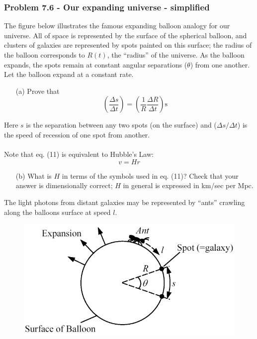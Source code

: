 \documentclass[12pt,a4paper]{article}
\begin{document}
\subsubsection*{Problem 7.6 - Our expanding universe - simplified}
The figure below illustrates the famous expanding balloon analogy for our universe. All of space is represented by the surface of the spherical balloon, and clusters of galaxies are represented by spots
painted on this surface; the radius of the balloon corresponds to $R(t)$, the “radius” of the universe. As the balloon expands, the spots remain at constant angular separations ($\theta$) from one another. Let the balloon expand at a constant rate.
\begin{enumerate}
    \item[(a)]Prove that
    \begin{equation}
        \left(\frac{\Delta s}{\Delta t}\right)=\left(\frac{1}{R}\frac{\Delta R}{\Delta t}\right)\text{s}
    \end{equation}
\end{enumerate}
Here $s$ is the separation between any two spots (on the surface) and ($\Delta s/\Delta t$) is the speed of recession of one spot from another.
\\
\\Note that eq. (11) is equivalent to Hubble’s Law:
\begin{equation}
    v=Hr
\end{equation}
\begin{enumerate}
    \item[(b)]What is $H$ in terms of the symbols used in eq. (11)? Check that your answer is dimensionally correct; $H$ in general is expressed in km/sec per Mpc. 
\end{enumerate}
The light photons from distant galaxies may be represented by “ants” crawling along the balloons surface at speed $l$.
\begin{figure}[h]
    \centering
    \includegraphics[width=0.7\linewidth]{figs/fig_prob_7.6.png}
\end{figure}
\end{document}

